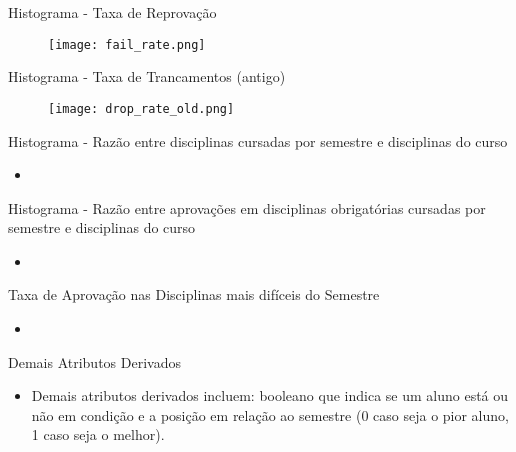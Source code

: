 \begin{frame}{Histograma - Taxa de Reprovação}
    \begin{figure}[!ht]
    \centering
    \texttt{[image: fail\_rate.png]}
    \end{figure}
\end{frame}

\begin{frame}{Histograma - Taxa de Trancamentos (antigo)}
    \begin{figure}[!ht]
    \centering
    \texttt{[image: drop\_rate\_old.png]}
    \end{figure}
\end{frame}

\begin{frame}{Histograma - Razão entre disciplinas cursadas por semestre e
    disciplinas do curso}
\begin{itemize}[itemsep=3ex]
        \item <Por histograma aqui>
\end{itemize}
\end{frame}

\begin{frame}{Histograma - Razão entre aprovações em disciplinas obrigatórias cursadas 
        por semestre e disciplinas do curso}
\begin{itemize}[itemsep=3ex]
        \item <Por histograma aqui>
\end{itemize}
\end{frame}

\begin{frame}{Taxa de Aprovação nas Disciplinas mais difíceis do Semestre}
\begin{itemize}[itemsep=3ex]
        \item <Por histograma aqui>
\end{itemize}
\end{frame}

\begin{frame}{Demais Atributos Derivados}
\begin{itemize}[itemsep=3ex]
        \item Demais atributos derivados incluem: booleano que indica se um aluno
            está ou não em condição e 
            a posição em relação ao semestre (0 caso seja o pior aluno, 1 caso seja o
            melhor).
\end{itemize}
\end{frame}

